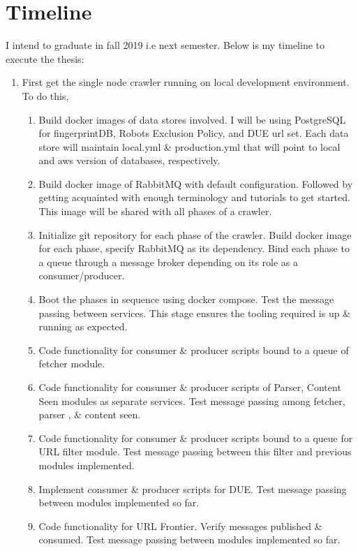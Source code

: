 \chapter{Timeline}
I intend to graduate in fall 2019 i.e next semester. Below is my timeline to execute the thesis:
\begin{enumerate}
\item First get the single node crawler running on local development environment. To do this,
  \begin{enumerate}
  \item Build docker images of data stores involved. I will be using PostgreSQL for
    fingerprintDB, Robots Exclusion Policy, and DUE url set. Each data store will maintain local.yml
    \& production.yml that will point to local and aws version of databases, respectively.
  \item Build docker image of RabbitMQ with default configuration. Followed by getting acquainted with
    enough terminology and tutorials to get started. This image will be shared with all phases of a
    crawler.
  \item Initialize git repository for each phase of the crawler. Build docker image for each phase,
    specify RabbitMQ as its dependency. Bind each phase to a queue through a message broker depending
    on its role as a consumer/producer.
  \item Boot the phases in sequence using docker compose. Test the message passing between services.
    This stage ensures the tooling required is up \& running as expected.
  \item Code functionality for consumer \& producer scripts bound to a queue of fetcher module. 
  \item Code functionality for consumer \& producer scripts of Parser, Content Seen modules as separate
    services. Test message passing among fetcher, parser , \& content seen.
  \item Code functionality for consumer \& producer scripts bound to a queue for URL filter module. Test
    message passing between this filter and previous modules implemented.
  \item Implement consumer \& producer scripts for DUE. Test message passing between modules implemented
    so far.
  \item Code functionality for URL Frontier. Verify messages published \& consumed. Test message passing
    between modules implemented so far.
  \end{enumerate}
  
\end{enumerate}
